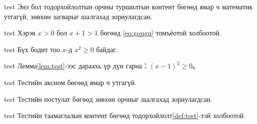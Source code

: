 \documentclass[mn]{../../elegantbook}
\begin{document}
\ifdefined\simpleTest
\begin{definition}\label{def:test}
\else
\begin{definition}{test}
\fi
Энэ бол тодорхойлолтын орчны туршилтын контент бөгөөд ямар ч математик утгагүй, зөвхөн загварыг шалгахад зориулагдсан.
\end{definition}

\ifdefined\simpleTest
\begin{theorem}\label{thm:test}
\else
\begin{theorem}{test}
\fi
Хэрэв $x>0$ бол $x+1>1$ бөгөөд \eqref{eq:gougu} томъёотой холбоотой.
\end{theorem}

\ifdefined\simpleTest
\begin{lemma}\label{lem:test}
\else
\begin{lemma}{test}
\fi
Бүх бодит тоо $x$-д $x^2\geq0$ байдаг.
\end{lemma}

\ifdefined\simpleTest
\begin{corollary}\label{cor:test}
\else
\begin{corollary}{test}
\fi
Лемма\ref{lem:test}-ээс дараахь үр дүн гарна：$(x-1)^2\geq0$。
\end{corollary}

\ifdefined\simpleTest
\begin{axiom}\label{axi:test}
\else
\begin{axiom}{test}
\fi
Тестийн аксиом бөгөөд ямар ч утгагүй.
\end{axiom}

\ifdefined\simpleTest
\begin{postulate}\label{pos:test}
\else
\begin{postulate}{test}
\fi
Тестийн постулат бөгөөд зөвхөн орчныг шалгахад зориулагдсан.
\end{postulate}

\ifdefined\simpleTest
\begin{proposition}\label{pro:test}
\else
\begin{proposition}{test}
\fi
Тестийн таамаглалын контент бөгөөд тодорхойлолт\ref{def:test}-тэй холбоотой.
\end{proposition}


\end{proposition}
\end{postulate}
\end{axiom}
\end{corollary}
\end{lemma}
\end{theorem}
\end{definition}
\end{document}
